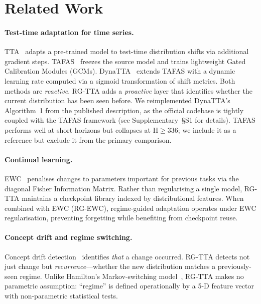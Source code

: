 \documentclass[journal]{IEEEtran}
\begin{document}
\section{Related Work}
\label{sec:related}

\paragraph{Test-time adaptation for time series.}
TTA~\cite{liang2024tta} adapts a pre-trained model to test-time distribution shifts via additional gradient steps. TAFAS~\cite{kim2025tafas} freezes the source model and trains lightweight Gated Calibration Modules (GCMs). DynaTTA~\cite{grover2025dynatta} extends TAFAS with a dynamic learning rate computed via a sigmoid transformation of shift metrics. Both methods are \emph{reactive}. RG-TTA adds a \emph{proactive} layer that identifies whether the current distribution has been seen before. We reimplemented DynaTTA's Algorithm~1 from the published description, as the official codebase is tightly coupled with the TAFAS framework (see Supplementary~\S{S1} for details). TAFAS performs well at short horizons but collapses at H$\geq$336; we include it as a reference but exclude it from the primary comparison.

\paragraph{Continual learning.}
EWC~\cite{kirkpatrick2017ewc} penalises changes to parameters important for previous tasks via the diagonal Fisher Information Matrix. Rather than regularising a single model, RG-TTA maintains a checkpoint library indexed by distributional features. When combined with EWC (RG-EWC), regime-guided adaptation operates under EWC regularisation, preventing forgetting while benefiting from checkpoint reuse.

\paragraph{Concept drift and regime switching.}
Concept drift detection~\cite{gama2014concept,lu2018concept} identifies \emph{that} a change occurred. RG-TTA detects not just change but \emph{recurrence}---whether the new distribution matches a previously-seen regime. Unlike Hamilton's Markov-switching model~\cite{hamilton1989}, RG-TTA makes no parametric assumption: ``regime'' is defined operationally by a 5-D feature vector with non-parametric statistical tests.
\end{document}
